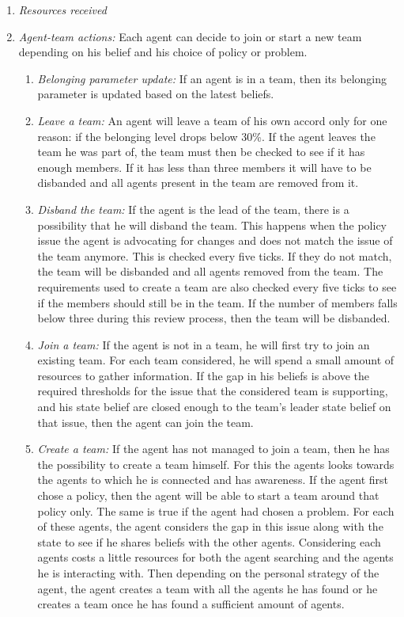 \begin{enumerate}
\begin{enumerate}
		\begin{enumerate}
		\item \emph{Resources received}
		\item \emph{Agent-team actions:} Each agent can decide to join or start a new team depending on his belief and his choice of policy or problem.
			\begin{enumerate}
			\item \emph{Belonging parameter update:} If an agent is in a team, then its belonging parameter is updated based on the latest beliefs. 
			\item \emph{Leave a team:} An agent will leave a team of his own accord only for one reason: if the belonging level drops below 30\%. If the agent leaves the team he was part of, the team must then be checked to see if it has enough members. If it has less than three members it will have to be disbanded and all agents present in the team are removed from it.
			\item \emph{Disband the team:} If the agent is the lead of the team, there is a possibility that he will disband the team. This happens when the policy issue the agent is advocating for changes and does not match the issue of the team anymore. This is checked every five ticks. If they do not match, the team will be disbanded and all agents removed from the team. The requirements used to create a team are also checked every five ticks to see if the members should still be in the team. If the number of members falls below three during this review process, then the team will be disbanded.
			\item \emph{Join a team:} If the agent is not in a team, he will first try to join an existing team. For each team considered, he will spend a small amount of resources to gather information. If the gap in his beliefs is above the required thresholds for the issue that the considered team is supporting, and his state belief are closed enough to the team's leader state belief on that issue, then the agent can join the team.
			\item \emph{Create a team:} If the agent has not managed to join a team, then he has the possibility to create a team himself. For this the agents looks towards the agents to which he is connected and has awareness. If the agent first chose a policy, then the agent will be able to start a team around that policy only. The same is true if the agent had chosen a problem. For each of these agents, the agent considers the gap in this issue along with the state to see if he shares beliefs with the other agents. Considering each agents costs a little resources for both the agent searching and the agents he is interacting with. Then depending on the personal strategy of the agent, the agent creates a team with all the agents he has found or he creates a team once he has found a sufficient amount of agents.	

\end{enumerate}
\end{enumerate}
\end{enumerate}
\end{enumerate}
